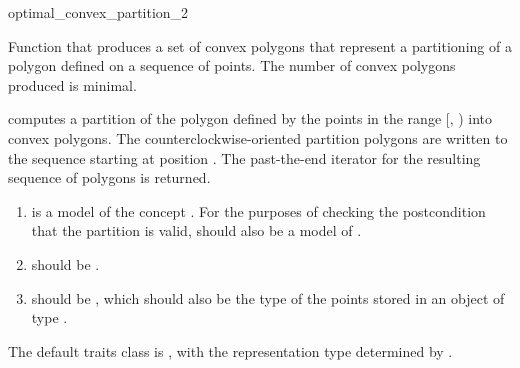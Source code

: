 \begin{ccRefFunction}{optimal_convex_partition_2}

Function that produces a set of convex polygons 
that represent a partitioning of a polygon defined on a sequence of 
points. 
The number of convex polygons produced is minimal.


{
computes a partition of the polygon defined
by the points in the range [, ) into convex
polygons. The counterclockwise-oriented partition polygons are written to
the sequence starting at position .  The past-the-end iterator for
the resulting sequence of polygons is returned.
\ccPrecond{The points in the range [\ccc{first}, \ccc{beyond}) define a
simple, counterclockwise-oriented polygon.}
}

\begin{enumerate}
    \item {} is a model of the concept %
          .
          For the purposes of checking the
          postcondition that the partition is valid,  should
          also be a model of .
    \item {} should be
          .
    \item {} should be ,
          which should also be the type of the points stored in an object
          of type .
\end{enumerate}

The default traits class  is ,
with the representation type determined by .

\ccSeeAlso
{} \\
 \\
 \\
 \\



\end{ccRefFunction}
